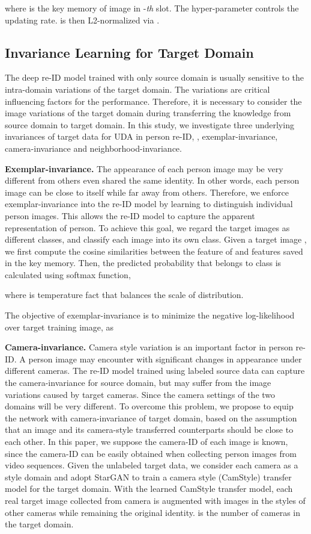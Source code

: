 \documentclass[10pt,twocolumn,letterpaper]{article}
\begin{document}
where  is the key memory of image  in -\emph{th} slot. The hyper-parameter   controls the updating rate.  is then L2-normalized via .


\subsection{Invariance Learning for Target Domain}

The deep re-ID model trained with only source domain is usually sensitive to the intra-domain variations of the target domain. The variations are critical influencing factors for the performance. Therefore, it is necessary to consider the image variations of the target domain during transferring the knowledge from source domain to target domain. In this study, we investigate three underlying invariances of target data for UDA in person re-ID, \ie, exemplar-invariance, camera-invariance and neighborhood-invariance.


\textbf{Exemplar-invariance.} The appearance of each person image may be very different from others even shared the same identity. In other words, each person image can be close to itself while far away from others. Therefore, we enforce exemplar-invariance into the re-ID model by learning to distinguish individual person images. This allows the re-ID model to capture the apparent representation of person. To achieve this goal, we regard the  target images as  different classes, and classify each image into its own class. Given a target image , we first compute the cosine similarities between the feature of  and features saved in the key memory. Then, the predicted probability that  belongs to class  is calculated using softmax function,

where  is temperature fact that balances the scale of distribution.

The objective of exemplar-invariance is to minimize the negative log-likelihood over target training image, as




\textbf{Camera-invariance.} Camera style variation is an important factor in person re-ID. A person image may encounter with significant changes in appearance under different cameras. The re-ID model trained using labeled source data can capture the camera-invariance for source domain, but may suffer from the image variations caused by target cameras. Since the camera settings of the two domains will be very different.  
To overcome this problem, we propose to equip the network with camera-invariance \cite{Zhong_2018_ECCV} of target domain, based on the assumption that an image and its camera-style transferred counterparts should be close to each other. 
In this paper, we suppose the camera-ID of each image is known, since the camera-ID can be easily obtained when collecting person images from video sequences. Given the unlabeled target data, we consider each camera as a style domain and adopt StarGAN \cite{stargan} to train a camera style (CamStyle) transfer model \cite{zhong2018camera} for the target domain. With the learned CamStyle transfer model, each real target image collected from camera  is augmented with  images in the styles of other cameras while remaining the original identity.  is the number of cameras in the target domain. 
\end{document}
